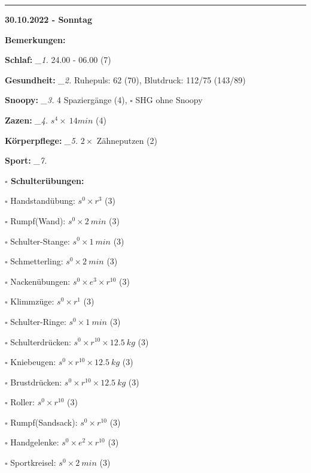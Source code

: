 \documentclass[10pt,a4paper]{article}
\newcommand\prop[1] {{\color {alizarin} {\bf #1}}}             %
\newcommand\rele[1] {{\color {english} \bf {#1}}}              %
\newcommand\mand[1] {{\color {burntorange} {\bf #1}}}          %
\newcommand\ddivide {\vskip -9pt \hrule \vskip 6pt}
\newcommand\topspace{\vskip -15pt \hskip 20pt}
\newcommand\n[1] { {\sl #1.} \hskip 5pt }
\begin{document}
\ddivide
{\rele {30.10.2022 - Sonntag}}

\begin{mdframed}[style=daystyle]
  \begin{labeling}{{\mand {Bemerkungen:}}}
    \setlength\itemsep{-3pt}
  \item[{\mand {Schlaf:}}]        \n{\_1} 24.00 - 06.00 (7)
  \item[{\mand {Gesundheit:}}]    \n{\_2} Ruhepuls: 62 (70), Blutdruck: 112/75 (143/89)
  \item[{\mand {Snoopy:}}]        \n{\_3} 4 Spaziergänge (4), $\square$ SHG ohne Snoopy
  \item[{\mand {Zazen:}}]         \n{\_4} $s^4 \times\ 14 min$ (4)
  \item[{\mand {Körperpflege:}}]  \n{\_5} $2 \times$ Zähneputzen (2)
  \item[{\mand {Sport:}}]         \n{\_7}
    \topspace
    \begin{minipage}{0.75\textwidth}  
      \begin{labeling}{\prop {$\square$ {Schulterübungen:}}} 
        \setlength\itemsep{-3pt}
      \item[$\square$ Handstandübung:]  $s^0 \times r^{3}$ (3)
      \item[$\square$ Rumpf(Wand):]     $s^0 \times 2\ min$ (3)
      \item[$\square$ Schulter-Stange:] $s^0 \times 1\ min$ (3)
      \item[$\square$ Schmetterling:]   $s^0 \times 2\ min$ (3)
      \item[$\square$ Nackenübungen:]   $s^0 \times e^3 \times r^{10}$ (3)
      \item[$\square$ Klimmzüge:]       $s^0 \times r^1$ (3)
      \item[$\square$ Schulter-Ringe:]  $s^0 \times 1\ min$ (3)
      \item[$\square$ Schulterdrücken:] $s^0 \times r^{10} \times 12.5\ kg$ (3)
      \item[$\square$ Kniebeugen:]      $s^0 \times r^{10} \times 12.5\ kg$ (3)
      \item[$\square$ Brustdrücken:]    $s^0 \times r^{10} \times 12.5\ kg$ (3)
      \item[$\square$ Roller:]          $s^0 \times r^{10}$ (3)
      \item[$\square$ Rumpf(Sandsack):] $s^0 \times r^{10}$ (3)
      \item[$\square$ Handgelenke:]     $s^0 \times e^2 \times r^{10}$ (3)
      \item[$\square$ Sportkreisel:]    $s^0 \times 2\ min$ (3)

\end{labeling}
\end{minipage}
\end{labeling}
\end{mdframed}
\end{document}
